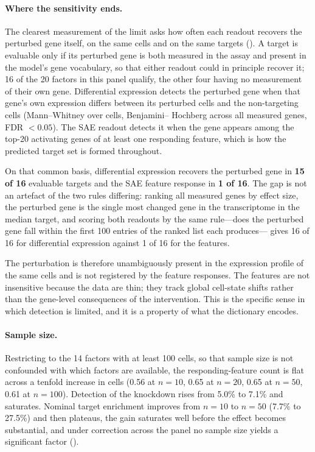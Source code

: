 \paragraph{Where the sensitivity ends.} The clearest measurement of the limit asks how often each
readout recovers the perturbed gene itself, on the same cells and on the same targets
(). A target is evaluable only if its perturbed gene is both measured in the
assay and present in the model's gene vocabulary, so that either readout could in principle recover
it; 16 of the 20 factors in this panel qualify, the other four having no measurement of their own
gene. Differential expression detects the perturbed gene when that gene's own expression differs
between its perturbed cells and the non-targeting cells (Mann--Whitney over cells, Benjamini--
Hochberg across all measured genes, FDR $< 0.05$). The SAE readout detects it when the gene appears
among the top-20 activating genes of at least one responding feature, which is how the predicted
target set is formed throughout.

On that common basis, differential expression recovers the perturbed gene in \textbf{15 of 16}
evaluable targets and the SAE feature response in \textbf{1 of 16}. The gap is not an artefact of
the two rules differing: ranking all measured genes by effect size, the perturbed gene is the single
most changed gene in the transcriptome in the median target, and scoring both readouts by the same
rule---does the perturbed gene fall within the first 100 entries of the ranked list each produces---
gives 16 of 16 for differential expression against 1 of 16 for the features.

The perturbation is therefore unambiguously present in the expression profile of the same cells and
is not registered by the feature responses. The features are not insensitive because the data are
thin; they track global cell-state shifts rather than the gene-level consequences of the
intervention. This is the specific sense in which detection is limited, and it is a property of what
the dictionary encodes.

\paragraph{Sample size.} Restricting to the 14 factors with at least 100 cells, so that sample size
is not confounded with which factors are available, the responding-feature count is flat across a
tenfold increase in cells (0.56 at $n{=}10$, 0.65 at $n{=}20$, 0.65 at $n{=}50$, 0.61 at
$n{=}100$). Detection of the knockdown rises from 5.0\% to 7.1\% and saturates. Nominal target
enrichment improves from $n{=}10$ to $n{=}50$ (7.7\% to 27.5\%) and then plateaus, the gain
saturates well before the effect becomes substantial, and under correction across the panel no
sample size yields a significant factor
().

